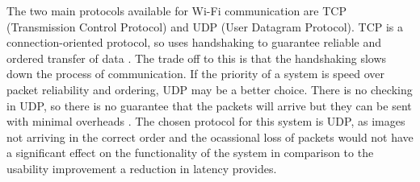 The two main protocols available for Wi-Fi communication are TCP (Transmission Control Protocol) and UDP (User Datagram Protocol). TCP is a connection-oriented protocol, so uses handshaking to guarantee reliable and ordered transfer of data \cite{fall2011tcp}. The trade off to this is that the handshaking slows down the process of communication. If the priority of a system is speed over packet reliability and ordering, UDP may be a better choice. There is no checking in UDP, so there is no guarantee that the packets will arrive but they can be sent with minimal overheads \cite{postel1980user}. The chosen protocol for this system is UDP, as images not arriving in the correct order and the ocassional loss of packets would not have a significant effect on the functionality of the system in comparison to the usability improvement a reduction in latency provides.